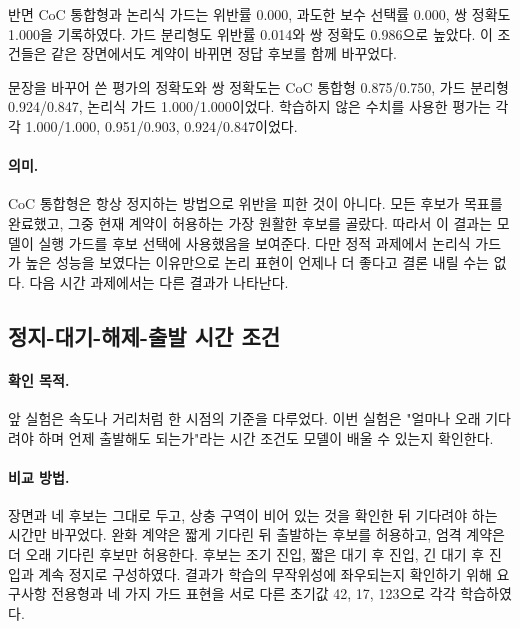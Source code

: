 반면 CoC 통합형과 논리식 가드는 위반률 0.000, 과도한 보수 선택률 0.000, 쌍 정확도 1.000을 기록하였다. 가드 분리형도 위반률 0.014와 쌍 정확도 0.986으로 높았다. 이 조건들은 같은 장면에서도 계약이 바뀌면 정답 후보를 함께 바꾸었다.

문장을 바꾸어 쓴 평가의 정확도와 쌍 정확도는 CoC 통합형 0.875/0.750, 가드 분리형 0.924/0.847, 논리식 가드 1.000/1.000이었다. 학습하지 않은 수치를 사용한 평가는 각각 1.000/1.000, 0.951/0.903, 0.924/0.847이었다.

\paragraph{의미.}
CoC 통합형은 항상 정지하는 방법으로 위반을 피한 것이 아니다. 모든 후보가 목표를 완료했고, 그중 현재 계약이 허용하는 가장 원활한 후보를 골랐다. 따라서 이 결과는 모델이 실행 가드를 후보 선택에 사용했음을 보여준다. 다만 정적 과제에서 논리식 가드가 높은 성능을 보였다는 이유만으로 논리 표현이 언제나 더 좋다고 결론 내릴 수는 없다. 다음 시간 과제에서는 다른 결과가 나타난다.

\subsection{정지-대기-해제-출발 시간 조건}

\paragraph{확인 목적.}
앞 실험은 속도나 거리처럼 한 시점의 기준을 다루었다. 이번 실험은 "얼마나 오래 기다려야 하며 언제 출발해도 되는가"라는 시간 조건도 모델이 배울 수 있는지 확인한다.

\paragraph{비교 방법.}
장면과 네 후보는 그대로 두고, 상충 구역이 비어 있는 것을 확인한 뒤 기다려야 하는 시간만 바꾸었다. 완화 계약은 짧게 기다린 뒤 출발하는 후보를 허용하고, 엄격 계약은 더 오래 기다린 후보만 허용한다. 후보는 조기 진입, 짧은 대기 후 진입, 긴 대기 후 진입과 계속 정지로 구성하였다. 결과가 학습의 무작위성에 좌우되는지 확인하기 위해 요구사항 전용형과 네 가지 가드 표현을 서로 다른 초기값 42, 17, 123으로 각각 학습하였다.

